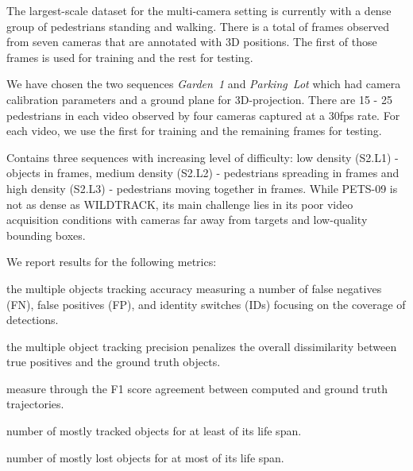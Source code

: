 \begin{packed_description}
\item[- \normalfont\textit{WILDTRACK}~\cite{chavdarova2018wildtrack}:]
The largest-scale dataset for the multi-camera setting is currently with a dense group of  pedestrians standing and walking.
There is a total of  frames observed from seven cameras that are annotated with 3D positions.
The first  of those frames is used for training and the rest for testing. 
\item[- \normalfont\textit{Campus}~\cite{xu2016multi}:] We have chosen the two sequences \textit{Garden~1} and \textit{Parking~Lot} which had camera calibration parameters and a ground plane for 3D-projection. There are 15 - 25 pedestrians in each video observed by four cameras captured at a 30fps rate.
For each video, we use the first  for training and the remaining frames for testing. 
\item[- \normalfont\textit{PETS-09}~\cite{ellis2009pets2009}:]
Contains three sequences with increasing level of difficulty:
low density (S2.L1) -  objects in  frames, medium density (S2.L2) -  pedestrians spreading in  frames and high density (S2.L3) -  pedestrians moving together in  frames.
While PETS-09 is not as dense as WILDTRACK, its main challenge lies in its poor video acquisition conditions with cameras far away from targets and low-quality bounding boxes. 
\end{packed_description}
\vspace{-0.1in}
We report results for the following metrics:
\begin{packed_description}
\item[- \normalfont MOTA~\cite{bernardin2008evaluating}:] the multiple objects tracking accuracy measuring a number of false negatives (FN), false positives (FP), and identity switches (IDs) focusing on the coverage of detections. 
\item[- \normalfont MOTP~\cite{bernardin2008evaluating}:]
the multiple object tracking precision penalizes the overall dissimilarity between true positives and the ground truth objects.
\item[- \normalfont IDF1~\cite{ristani2014tracking}:] 
measure through the F1 score agreement between computed and ground truth trajectories.
\item[- \normalfont MT \cite{li2009learning}:] number of mostly tracked objects for at least  of its life span.
\item[- \normalfont ML \cite{li2009learning}:] number of mostly lost objects for at most  of its life span.
\end{packed_description}
